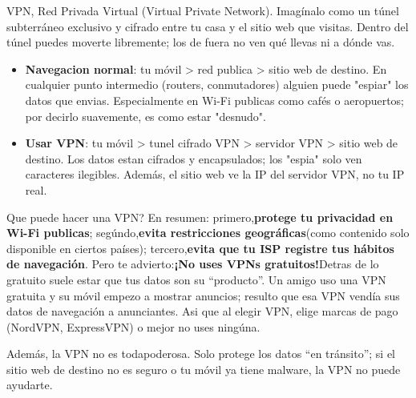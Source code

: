 


VPN, Red Privada Virtual (Virtual Private Network). Imagínalo como un túnel subterráneo exclusivo y cifrado entre tu casa y el sitio web que visitas. Dentro del túnel puedes moverte libremente; los de fuera no ven qué llevas ni a dónde vas.

\begin{itemize}
  \item \textbf{Navegacion normal}: tu móvil > red publica > sitio web de destino. En cualquier punto intermedio (routers, conmutadores) alguien puede "espiar" los datos que envias. Especialmente en Wi-Fi publicas como cafés o aeropuertos; por decirlo suavemente, es como estar "desnudo".
  \item \textbf{Usar VPN}: tu móvil > tunel cifrado VPN > servidor VPN > sitio web de destino. Los datos estan cifrados y encapsulados; los "espia" solo ven caracteres ilegibles. Además, el sitio web ve la IP del servidor VPN, no tu IP real.
\end{itemize}

Que puede hacer una VPN? En resumen: primero,\textbf{protege tu privacidad en Wi-Fi publicas}; segúndo,\textbf{evita restricciones geográficas}(como contenido solo disponible en ciertos países); tercero,\textbf{evita que tu ISP registre tus hábitos de navegación}. Pero te advierto:\textbf{¡No uses VPNs gratuitos!}Detras de lo gratuito suele estar que tus datos son su “producto”. Un amigo uso una VPN gratuita y su móvil empezo a mostrar anuncios; resulto que esa VPN vendía sus datos de navegación a anunciantes. Asi que al elegir VPN, elige marcas de pago (NordVPN, ExpressVPN) o mejor no uses ningúna.

Además, la VPN no es todapoderosa. Solo protege los datos “en tránsito”; si el sitio web de destino no es seguro o tu móvil ya tiene malware, la VPN no puede ayudarte.


